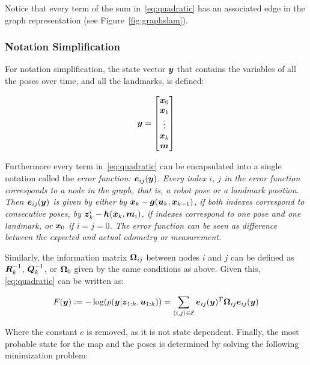 Notice that every term of the sum in~\eqref{eq:quadratic} has an associated edge in the graph representation (see Figure~\ref{fig:graphslam}). 

\subsubsection{Notation Simplification}
\label{sec:notation-simplification}

For notation simplification, the state vector $\boldsymbol{y}$ that contains the variables of all the poses over time, and all the landmarks, is defined:

\begin{equation}
\boldsymbol{y} = \begin{bmatrix}
\boldsymbol{x}_0\\
\boldsymbol{x}_1\\
\vdots\\
\boldsymbol{x}_k\\
\boldsymbol{m}
\end{bmatrix}
\end{equation}

Furthermore every term in~\eqref{eq:quadratic} can be encapsulated into a single notation called the \it{error function}: $\boldsymbol{e}_{ij}(\boldsymbol{y})$. Every index $i$, $j$ in the error function corresponds to a node in the graph, that is, a robot pose or a landmark position. Then $\boldsymbol{e}_{ij}(\boldsymbol{y})$ is given by either by $\boldsymbol{x}_k-\boldsymbol{g}(\boldsymbol{u}_k,\boldsymbol{x}_{k-1})$, if both indexes correspond to consecutive poses, by $\boldsymbol{z}_k^i-\boldsymbol{h}(\boldsymbol{x}_k,\boldsymbol{m}_i)$, if indexes correspond to one pose and one landmark, or $\boldsymbol{x}_0$ if $i=j=0$. The error function can be seen as difference between the expected and actual odometry or measurement. 

Similarly, the information matrix $\boldsymbol{\Omega}_{ij}$ between nodes $i$ and $j$ can be defined as $\boldsymbol{R}_k^{-1}$, $\boldsymbol{Q}_k^{-1}$, or $\boldsymbol{\Omega}_0$ given by the same conditions as above. Given this,\eqref{eq:quadratic} can be written as:

\begin{equation}
F(\boldsymbol{y}) \vcentcolon= -\log(p(\boldsymbol{y}|\boldsymbol{z}_{1:k},\boldsymbol{u}_{1:k})) = \sum_{\left<i,j\right>\in\mathcal{E}}\boldsymbol{e}_{ij}(\boldsymbol{y})^T\boldsymbol{\Omega}_{ij} \boldsymbol{e}_{ij}(\boldsymbol{y}) 
\label{eq:simplified}
\end{equation}

\noindent
Where the constant $c$ is removed, as it is not state dependent. Finally, the most probable state for the map and the poses is determined by solving the following minimization problem: 

